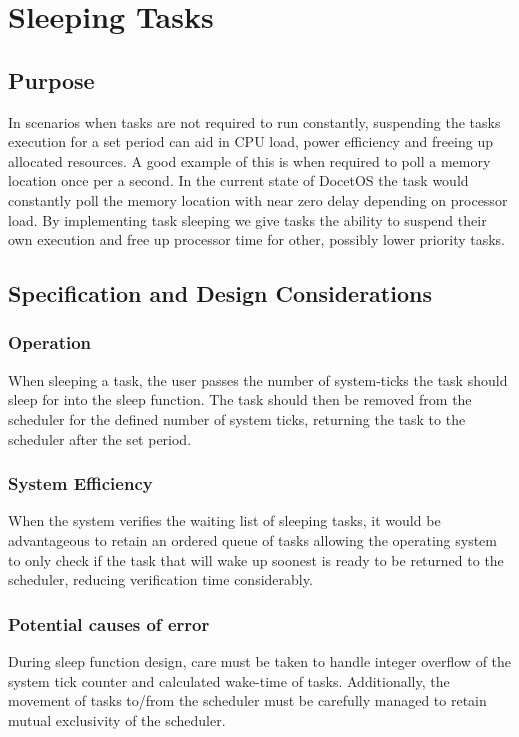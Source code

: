 \section{Sleeping Tasks}
\subsection{Purpose}
In scenarios when tasks are not required to run constantly, suspending the tasks execution for a set period can aid in CPU load, power efficiency and freeing up allocated resources. A good example of this is when required to poll a memory location once per a second. In the current state of DocetOS the task would constantly poll the memory location with near zero delay depending on processor load. By implementing task sleeping we give tasks the ability to suspend their own execution and free up processor time for other, possibly lower priority tasks.
\pagebreak
\subsection{Specification and Design Considerations}
\subsubsection{Operation}
When sleeping a task, the user passes the number of system-ticks the task should sleep for into the sleep function. The task should then be removed from the scheduler for the defined number of system ticks, returning the task to the scheduler after the set period.

\subsubsection{System Efficiency}
When the system verifies the waiting list of sleeping tasks, it would be advantageous to retain an ordered queue of tasks allowing the operating system to only check if the task that will wake up soonest is ready to be returned to the scheduler, reducing verification time considerably.

\subsubsection{Potential causes of error}
During sleep function design, care must be taken to handle integer overflow of the system tick counter and calculated wake-time of tasks. Additionally, the movement of tasks to/from the scheduler must be carefully managed to retain mutual exclusivity of the scheduler.

